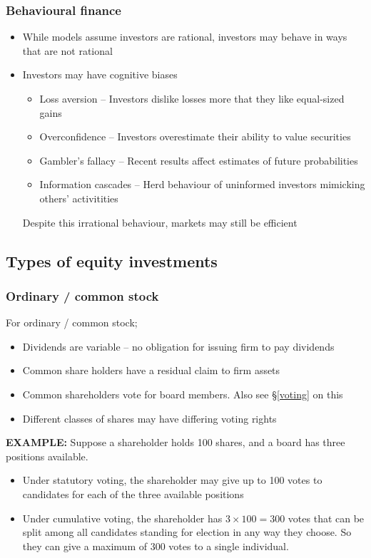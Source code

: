 \documentclass[../notes_compiled.tex]{subfiles}
\begin{document}
\subsubsection{Behavioural finance}
\begin{itemize}
\item While models assume investors are rational, investors may behave in ways that are not rational
\item Investors may have cognitive biases
\begin{itemize}
\item Loss aversion -- Investors dislike losses more that they like equal-sized gains
\item Overconfidence -- Investors overestimate their ability to value securities
\item Gambler’s fallacy -- Recent results affect estimates of future probabilities
\item Information cascades -- Herd behaviour of uninformed investors mimicking others’ activitities
\end{itemize}
Despite this irrational behaviour, markets may still be efficient
\end{itemize}

\subsection{Types of equity investments}
\subsubsection{Ordinary / common stock}
\begin{itemize}
\item For ordinary / common stock;
\begin{itemize}
\item Dividends are variable -- no obligation for issuing firm to pay dividends
\item Common share holders have a residual claim to firm assets
\item Common shareholders vote for board members. Also see \S\ref{voting} on this
\item Different classes of shares may have differing voting rights
\end{itemize}

{\color{RedViolet}
\item[] \textbf{EXAMPLE:} Suppose a shareholder holds 100 shares, and a board has three positions available.
}
{\color{RoyalBlue}
\begin{itemize}
\item Under statutory voting, the shareholder may give up to 100 votes to candidates for each of the three available positions
\item Under cumulative voting, the shareholder has $3\times100 = 300$ votes that can be split among all candidates standing for election in any way they choose. So they can give a maximum of 300 votes to a single individual.
\end{itemize}

}
\end{itemize}
\end{document}
